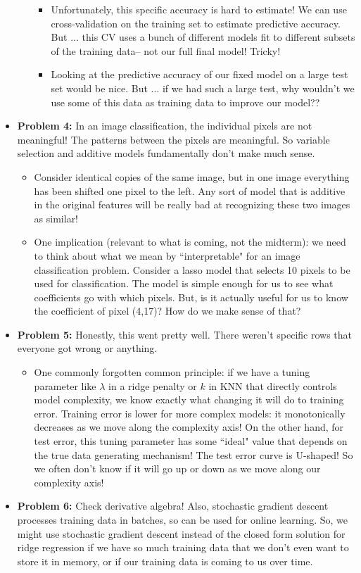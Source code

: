 \begin{itemize}
\begin{itemize}
\begin{itemize}
\item Unfortunately, this specific accuracy is hard to estimate! We can use cross-validation on the training set to estimate predictive accuracy. But ... this CV uses a bunch of different models fit to different subsets of the training data-- not our full final model! Tricky! 
\item Looking at the predictive accuracy of our fixed model on a large test set would be nice. But ... if we had such a large test, why wouldn't we use some of this data as training data to improve our model??
\end{itemize}	
\end{itemize}
\item \textbf{Problem 4: } In an image classification, the individual pixels are not meaningful! The patterns between the pixels are meaningful. So variable selection and additive models fundamentally don't make much sense. 
\begin{itemize}
\item Consider identical copies of the same image, but in one image everything has been shifted one pixel to the left. Any sort of model that is additive in the original features will be really bad at recognizing these two images as similar! 
\item One implication (relevant to what is coming, not the midterm): we need to think about what we mean by ``interpretable" for an image classification problem. Consider a lasso model that selects 10 pixels to be used for classification. The model is simple enough for us to see what coefficients go with which pixels. But, is it actually useful for us to know the coefficient of pixel (4,17)? How do we make sense of that? 
\end{itemize}
\item \textbf{Problem 5: } Honestly, this went pretty well. There weren't specific rows that everyone got wrong or anything. 
\begin{itemize}
\item One commonly forgotten common principle: if we have a tuning parameter like $\lambda$ in a ridge penalty or $k$ in KNN that directly controls model complexity, we know exactly what changing it will do to training error. Training error is lower for more complex models: it monotonically decreases as we move along the complexity axis! On the other hand, for test error, this tuning parameter has some ``ideal" value that depends on the true data generating mechanism! The test error curve is U-shaped! So we often don't know if it will go up or down as we move along our complexity axis! 
\end{itemize}
\item \textbf{Problem 6: } Check derivative algebra! Also, stochastic gradient descent processes training data in batches, so can be used for online learning. So, we might use stochastic gradient descent instead of the closed form solution for ridge regression if we have so much training data that we don't even want to store it in memory, or if our training data is coming to us over time.
\end{itemize}

